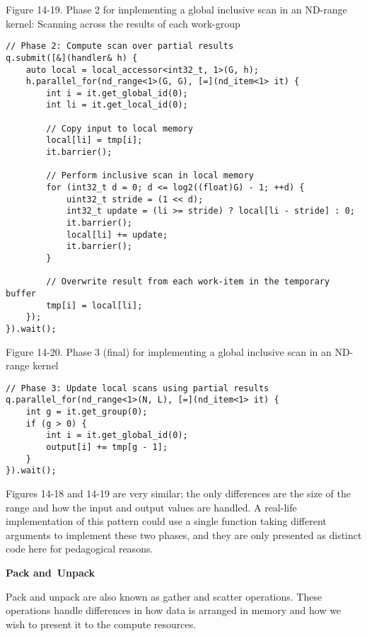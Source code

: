 \hspace*{\fill} \par %
Figure 14-19. Phase 2 for implementing a global inclusive scan in an ND-range kernel: Scanning across the results of each work-group
\begin{lstlisting}[caption={}]
// Phase 2: Compute scan over partial results
q.submit([&](handler& h) {
	auto local = local_accessor<int32_t, 1>(G, h);
	h.parallel_for(nd_range<1>(G, G), [=](nd_item<1> it) {
		int i = it.get_global_id(0);
		int li = it.get_local_id(0);
		
		// Copy input to local memory
		local[li] = tmp[i];
		it.barrier();
		
		// Perform inclusive scan in local memory
		for (int32_t d = 0; d <= log2((float)G) - 1; ++d) {
			uint32_t stride = (1 << d);
			int32_t update = (li >= stride) ? local[li - stride] : 0;
			it.barrier();
			local[li] += update;
			it.barrier();
		}
	
		// Overwrite result from each work-item in the temporary buffer
		tmp[i] = local[li];
	});
}).wait();
\end{lstlisting}

\hspace*{\fill} \par %
Figure 14-20. Phase 3 (final) for implementing a global inclusive scan in an ND-range kernel
\begin{lstlisting}[caption={}]
// Phase 3: Update local scans using partial results
q.parallel_for(nd_range<1>(N, L), [=](nd_item<1> it) {
	int g = it.get_group(0);
	if (g > 0) {
		int i = it.get_global_id(0);
		output[i] += tmp[g - 1];
	}
}).wait();
\end{lstlisting}

Figures 14-18 and 14-19 are very similar; the only differences are the size of the range and how the input and output values are handled. A real-life implementation of this pattern could use a single function taking different arguments to implement these two phases, and they are only presented as distinct code here for pedagogical reasons.\par

\hspace*{\fill} \par %
\textbf{Pack and Unpack}

Pack and unpack are also known as gather and scatter operations. These operations handle differences in how data is arranged in memory and how we wish to present it to the compute resources.\par

